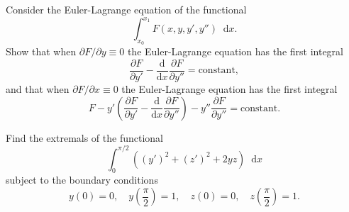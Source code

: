 \documentclass[answers]{exam}
\renewcommand*{\dd}{\mathop{}\!\mathrm d} %
\renewcommand*{\dv}[2]{\frac{\mathrm d#1}{\mathrm d#2}} %
\renewcommand*{\pdv}[2]{\frac{\partial #1}{\partial #2}} %
\begin{document}
\begin{questions}



\question%
Consider the Euler-Lagrange equation of the functional \[
	\int_{x_0}^{x_1} F(x, y, y', y'') \dd x .
\] Show that when $\partial F / \partial y \equiv 0$ the Euler-Lagrange equation has the first integral \[
	\pdv F{y'}-\dv{}x \pdv F{y''}=\text{constant},
\] and that when $\partial F / \partial x \equiv 0$ the Euler-Lagrange equation has the first integral \[
	F-y'\left(\pdv F{y'}-\dv{}x \pdv F{y''}\right)-y'' \pdv F{y''}=\text{constant}.
\]



\question%
Find the extremals of the functional \[
	\int_0^{\pi / 2}((y')^2+(z')^2+2 y z) \dd x
\] subject to the boundary conditions \[
	y(0)=0, \quad
	y\left(\frac\pi2\right)=1, \quad
	z(0)=0, \quad
	z\left(\frac\pi2\right)=1 .
\]

\end{questions}
\end{document}
